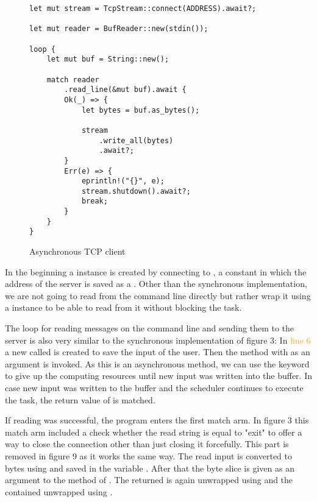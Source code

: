 \begin{figure}[ht]
    \begin{verbatim}
let mut stream = TcpStream::connect(ADDRESS).await?;

let mut reader = BufReader::new(stdin());

loop {
    let mut buf = String::new();

    match reader
        .read_line(&mut buf).await {
        Ok(_) => {
            let bytes = buf.as_bytes();

            stream
                .write_all(bytes)
                .await?;
        }
        Err(e) => {
            eprintln!("{}", e);
            stream.shutdown().await?;
            break;
        }
    }
}
    \end{verbatim}
    \caption{Asynchronous TCP client}
\end{figure}

In the beginning a  instance is created by connecting to , a constant in
which the address of the server is saved as a . Other than the synchronous implementation, we are not going
to read from the command line directly but rather wrap it using a  instance to be able to
read from it without blocking the task.

The loop for reading messages on the command line and sending them to the server is also very similar to the
synchronous implementation of figure 3: In \textcolor{orange}{line 6} a new  called  is created
to save the input of the user. Then the  method with  as an argument is invoked. As this is
an asynchronous method, we can use the  keyword to give up the computing resources until new input was
written into the buffer. In case new input was written to the buffer and the scheduler continues to execute the task,
the return value of  is matched.

If reading was successful, the program enters the first match arm. In figure 3 this match
arm included a check whether the read string is equal to "exit" to offer a way to close the connection other than just
closing it forcefully. This part is removed in figure 9 as it works the same way. The read input is converted to bytes
using  and saved in the variable . After that the byte slice is given as an argument to the
 method of . The returned  is again unwrapped using  and the
contained  unwrapped using .

